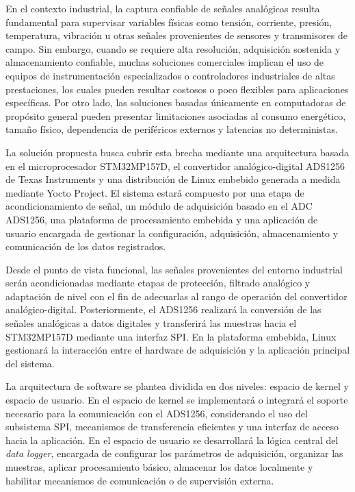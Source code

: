 \documentclass[
11pt, %
]{charter}
\begin{document}
En el contexto industrial, la captura confiable de señales analógicas resulta fundamental para supervisar variables físicas como tensión, corriente, presión, temperatura, vibración u otras señales provenientes de sensores y transmisores de campo. Sin embargo, cuando se requiere alta resolución, adquisición sostenida y almacenamiento confiable, muchas soluciones comerciales implican el uso de equipos de instrumentación especializados o controladores industriales de altas prestaciones, los cuales pueden resultar costosos o poco flexibles para aplicaciones específicas. Por otro lado, las soluciones basadas únicamente en computadoras de propósito general pueden presentar limitaciones asociadas al consumo energético, tamaño físico, dependencia de periféricos externos y latencias no deterministas.

La solución propuesta busca cubrir esta brecha mediante una arquitectura basada en el microprocesador STM32MP157D, el convertidor analógico-digital ADS1256 de Texas Instruments y una distribución de Linux embebido generada a medida mediante Yocto Project. El sistema estará compuesto por una etapa de acondicionamiento de señal, un módulo de adquisición basado en el ADC ADS1256, una plataforma de procesamiento embebida y una aplicación de usuario encargada de gestionar la configuración, adquisición, almacenamiento y comunicación de los datos registrados.

Desde el punto de vista funcional, las señales provenientes del entorno industrial serán acondicionadas mediante etapas de protección, filtrado analógico y adaptación de nivel con el fin de adecuarlas al rango de operación del convertidor analógico-digital. Posteriormente, el ADS1256 realizará la conversión de las señales analógicas a datos digitales y transferirá las muestras hacia el STM32MP157D mediante una interfaz SPI. En la plataforma embebida, Linux gestionará la interacción entre el hardware de adquisición y la aplicación principal del sistema.

La arquitectura de software se plantea dividida en dos niveles: espacio de kernel y espacio de usuario. En el espacio de kernel se implementará o integrará el soporte necesario para la comunicación con el ADS1256, considerando el uso del subsistema SPI, mecanismos de transferencia eficientes y una interfaz de acceso hacia la aplicación. En el espacio de usuario se desarrollará la lógica central del \textit{data logger}, encargada de configurar los parámetros de adquisición, organizar las muestras, aplicar procesamiento básico, almacenar los datos localmente y habilitar mecanismos de comunicación o de supervisión externa.
\end{document}
